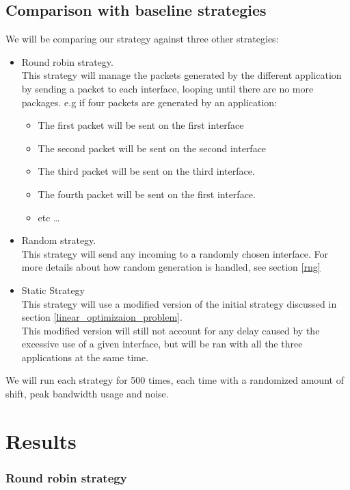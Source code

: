 \subsection{Comparison with baseline strategies}
We will be comparing our strategy against three other strategies:
\begin{itemize}
	\item Round robin strategy. \\
		  This strategy will manage the packets generated by the different application by sending a packet to each interface, looping until there are no more packages. e.g if four packets are generated by an application:
		  \begin{itemize}
		  	\item The first packet will be sent on the first interface
		  	\item The second packet will be sent on the second interface
		  	\item The third packet will be sent on the third interface.
		  	\item The fourth packet will be sent on the first interface.
		  	\item etc \dots
		  \end{itemize}
	\item Random strategy. \\
		  This strategy will send any incoming to a randomly chosen interface. For more details about how random generation is handled, see section \ref{rng} 
	\item Static Strategy \\
		  This strategy will use a modified version of the initial strategy discussed in section \ref{linear_optimizaion_problem}. \\
		  This modified version will still not account for any delay caused by the excessive use of a given interface, but will be ran with all the three applications at the same time.		 
\end{itemize}

We will run each strategy for 500 times, each time with a randomized amount of shift, peak bandwidth usage and noise.

\pagebreak

\section{Results}


\subsubsection{Round robin strategy}

